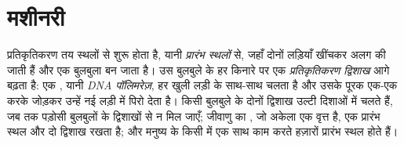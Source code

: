 \section{मशीनरी}

\begin{proposition}[प्रतिकृतिकरण द्विशाख]\label{prop:g11:dna-replication:forks}
प्रतिकृतिकरण तय स्थलों से शुरू होता है, यानी \emph{प्रारंभ स्थलों} से,
जहाँ दोनों लड़ियाँ खींचकर अलग की जाती हैं और एक बुलबुला बन जाता है। उस
बुलबुले के हर किनारे पर एक
\emph{प्रतिकृतिकरण द्विशाख} आगे बढ़ता है:
एक , यानी \emph{DNA पॉलिमरेज़}, हर खुली लड़ी
के साथ-साथ चलता है और उसके पूरक  एक-एक करके जोड़कर उन्हें
नई लड़ी में पिरो देता है। किसी बुलबुले के दोनों द्विशाख उल्टी दिशाओं में
चलते हैं, जब तक पड़ोसी बुलबुलों के द्विशाखों से न मिल जाएँ; जीवाणु का
, जो अकेला एक वृत्त है, एक प्रारंभ स्थल और दो द्विशाख रखता है;
और मनुष्य के किसी  में एक साथ काम करते हज़ारों प्रारंभ स्थल होते
हैं।
\end{proposition}
\admitted

